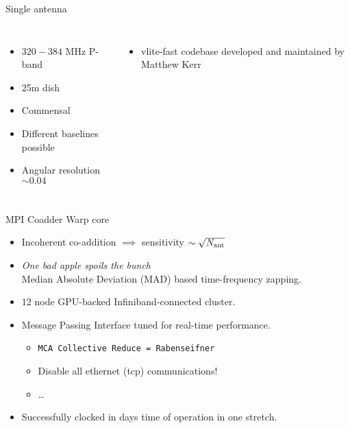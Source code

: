 
\begin{frame}{Single antenna}
\begin{columns}[onlytextwidth]
	\begin{itemize}
		\item $320-384$ MHz \hfill P-band
		\item 25m dish
		\item Commensal 
		\item Different baselines possible
		\item Angular resolution $\sim 0.04$
	\end{itemize}

	\begin{itemize}
		\item vlite-fast codebase developed and maintained by Matthew Kerr
	\end{itemize}
\end{columns}
\end{frame}

\begin{frame}{MPI Coadder \hfill Warp core}
	\begin{itemize}
		\item Incoherent co-addition $\implies$ sensitivity $\sim \sqrt{N_{\rm ant}}$
		\item \emph{One bad apple spoils the bunch} \\
			Median Absolute Deviation (MAD) based time-frequency zapping.
		\item $12$ node GPU-backed Infiniband-connected cluster.
		\item Message Passing Interface tuned for real-time performance.
			\begin{itemize}
				\item \texttt{MCA Collective Reduce = Rabenseifner}
				\item Disable all ethernet (tcp) communications!
				\item \dots
			\end{itemize}
		\item Successfully clocked in days time of operation in one stretch.
	\end{itemize}
\end{frame}

